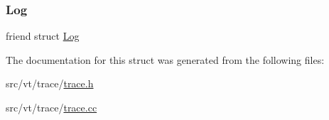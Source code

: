 \mbox{\label{structvt_1_1trace_1_1_trace_add132ae9df1b7ef820c8082c32b0f839}} 
\subsubsection{\texorpdfstring{Log}{Log}}
{\footnotesize\ttfamily friend struct \hyperlink{structvt_1_1trace_1_1_log}{Log}\hspace{0.3cm}{\ttfamily [friend]}}



The documentation for this struct was generated from the following files\+:\begin{DoxyCompactItemize}
\item 
src/vt/trace/\hyperlink{trace_8h}{trace.\+h}\item 
src/vt/trace/\hyperlink{trace_8cc}{trace.\+cc}\end{DoxyCompactItemize}
